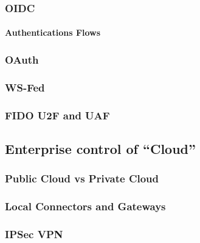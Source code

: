 \hypertarget{oidc}{%
\subsubsection{OIDC}\label{oidc}}

\hypertarget{authentications-flows}{%
\paragraph{Authentications Flows}\label{authentications-flows}}

\hypertarget{oauth}{%
\subsubsection{OAuth}\label{oauth}}

\hypertarget{ws-fed}{%
\subsubsection{WS-Fed}\label{ws-fed}}

\hypertarget{fido-u2f-and-uaf}{%
\subsubsection{FIDO U2F and UAF}\label{fido-u2f-and-uaf}}

\hypertarget{enterprise-control-of-cloud}{%
\subsection{Enterprise control of
``Cloud''}\label{enterprise-control-of-cloud}}

\hypertarget{public-cloud-vs-private-cloud}{%
\subsubsection{Public Cloud vs Private
Cloud}\label{public-cloud-vs-private-cloud}}

\hypertarget{local-connectors-and-gateways}{%
\subsubsection{Local Connectors and
Gateways}\label{local-connectors-and-gateways}}

\hypertarget{ipsec-vpn}{%
\subsubsection{IPSec VPN}\label{ipsec-vpn}}

